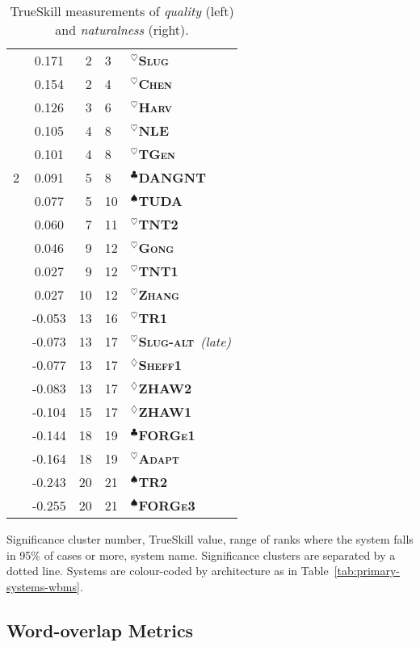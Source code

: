 \documentclass[11pt,a4paper]{article}
\newcommand\tgen{\textsc{TGen}\xspace}
\newcommand\slug{\textsc{Slug}\xspace}
\newcommand\slugalt{\textsc{Slug-alt}\xspace}
\newcommand\tntnlgi{\textsc{TNT1}\xspace}
\newcommand\tntnlgii{\textsc{TNT2}\xspace}
\newcommand\zhawi{\textsc{ZHAW1}\xspace}
\newcommand\zhawii{\textsc{ZHAW2}\xspace}
\newcommand\adapt{\textsc{Adapt}\xspace}
\newcommand\dangnt{\textsc{DANGNT}\xspace}
\newcommand\forgei{\textsc{FORGe1}\xspace}
\newcommand\forgeiii{\textsc{FORGe3}\xspace}
\newcommand\gong{\textsc{Gong}\xspace}
\newcommand\harv{\textsc{Harv}\xspace}
\newcommand\nle{\textsc{NLE}\xspace}
\newcommand\sheffi{\textsc{Sheff1}\xspace}
\newcommand\chen{\textsc{Chen}\xspace}
\newcommand\thomsoni{\textsc{TR1}\xspace}
\newcommand\thomsonii{\textsc{TR2}\xspace}
\newcommand\tuda{\textsc{TUDA}\xspace}
\newcommand\zhang{\textsc{Zhang}\xspace}
\newcommand{\symbseq}{$^\heartsuit$}
\newcommand{\symbdd}{$^\diamondsuit$}
\newcommand{\symbrule}{$^\clubsuit$}
\newcommand{\symbtempl}{$^\spadesuit$}
\newcommand\Ctgen{\textcolor{seqtoseq}{\symbseq\bf \tgen}}
\newcommand\Cslug{\textcolor{seqtoseq}{\symbseq\bf \slug}}
\newcommand\Cslugalt{\textcolor{seqtoseq}{\symbseq\bf \slugalt}}
\newcommand\Ctntnlgi{\textcolor{seqtoseq}{\symbseq\bf \tntnlgi}}
\newcommand\Ctntnlgii{\textcolor{seqtoseq}{\symbseq\bf \tntnlgii}}
\newcommand\Czhawi{\textcolor{datadriven}{\symbdd\bf \zhawi}}
\newcommand\Czhawii{\textcolor{datadriven}{\symbdd\bf \zhawii}}
\newcommand\Cadapt{\textcolor{seqtoseq}{\symbseq\bf \adapt}}
\newcommand\Cdangnt{\textcolor{rules}{\symbrule\bf \dangnt}}
\newcommand\Cforgei{\textcolor{rules}{\symbrule\bf \forgei}}
\newcommand\Cforgeiii{\textcolor{templates}{\symbtempl\bf \forgeiii}}
\newcommand\Cgong{\textcolor{seqtoseq}{\symbseq\bf \gong}}
\newcommand\Charv{\textcolor{seqtoseq}{\symbseq\bf \harv}}
\newcommand\Cnle{\textcolor{seqtoseq}{\symbseq\bf \nle}}
\newcommand\Csheffi{\textcolor{datadriven}{\symbdd\bf \sheffi}}
\newcommand\Cchen{\textcolor{seqtoseq}{\symbseq\bf \chen}}
\newcommand\Cthomsoni{\textcolor{seqtoseq}{\symbseq\bf \thomsoni}}
\newcommand\Cthomsonii{\textcolor{templates}{\symbtempl\bf \thomsonii}}
\newcommand\Ctuda{\textcolor{templates}{\symbtempl\bf \tuda}}
\newcommand\Czhang{\textcolor{seqtoseq}{\symbseq\bf \zhang}}
\begin{document}
\begin{table*}[tp]
\begin{center}
\begin{tabular}{ccr@{--}ll}
\multirow{11}{*}{2}  & \phantom{-}0.171  & 2 & 3  & \Cslug \\
& \phantom{-}0.154  & 2 & 4  & \Cchen \\
& \phantom{-}0.126  & 3 & 6  & \Charv \\
& \phantom{-}0.105  & 4 & 8  & \Cnle \\
& \phantom{-}0.101  & 4 & 8  & \Ctgen \\
& \phantom{-}0.091  & 5 & 8  & \Cdangnt \\
& \phantom{-}0.077  & 5 & 10  & \Ctuda \\
& \phantom{-}0.060  & 7 & 11  & \Ctntnlgii \\
& \phantom{-}0.046  & 9 & 12  & \Cgong \\
& \phantom{-}0.027  & 9 & 12  & \Ctntnlgi \\
& \phantom{-}0.027  & 10 & 12  & \Czhang \\\hdashline[0.5pt/2pt]
\multirow{5}{*}{3}  & -0.053  & 13 & 16  & \Cthomsoni \\
& -0.073  & 13 & 17  & \Cslugalt~\emph{(late)} \\
& -0.077  & 13 & 17  & \Csheffi \\
& -0.083  & 13 & 17  & \Czhawii \\
& -0.104  & 15 & 17  & \Czhawi \\\hdashline[0.5pt/2pt]
\multirow{2}{*}{4}  & -0.144  & 18 & 19  & \Cforgei \\
& -0.164  & 18 & 19  & \Cadapt \\\hdashline[0.5pt/2pt]
\multirow{2}{*}{5}  & -0.243  & 20 & 21  & \Cthomsonii \\
& -0.255  & 20 & 21  & \Cforgeiii \\
\end{tabular}
\end{center}
\caption{TrueSkill measurements of \emph{quality} (left) and \emph{naturalness} (right).}\label{tab:trueskill}

\small
Significance cluster number, TrueSkill value, range of ranks where the system falls in 95\% of cases or more, system name. Significance clusters are separated by a dotted line. Systems are colour-coded by architecture as in Table~\ref{tab:primary-systems-wbms}.
\end{table*}

\subsection{Word-overlap Metrics}
\label{sec:results-automatic}
\end{document}
